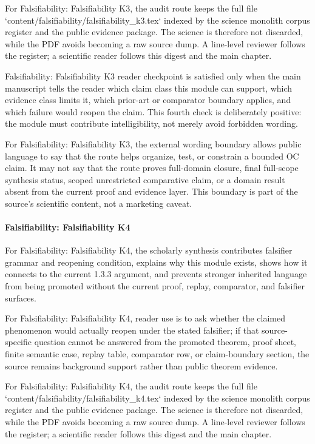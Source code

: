For Falsifiability: Falsifiability K3, the audit route keeps the full file `content/falsifiability/falsifiability\_k3.tex` indexed by the science monolith corpus register and the public evidence package. The science is therefore not discarded, while the PDF avoids becoming a raw source dump. A line-level reviewer follows the register; a scientific reader follows this digest and the main chapter.


Falsifiability: Falsifiability K3 reader checkpoint is satisfied only when the main manuscript tells the reader which claim class this module can support, which evidence class limits it, which prior-art or comparator boundary applies, and which failure would reopen the claim. This fourth check is deliberately positive: the module must contribute intelligibility, not merely avoid forbidden wording.


For Falsifiability: Falsifiability K3, the external wording boundary allows public language to say that the route helps organize, test, or constrain a bounded OC claim. It may not say that the route proves full-domain closure, final full-scope synthesis status, scoped unrestricted comparative claim, or a domain result absent from the current proof and evidence layer. This boundary is part of the source's scientific content, not a marketing caveat.


\paragraph{Falsifiability: Falsifiability K4}

For Falsifiability: Falsifiability K4, the scholarly synthesis contributes falsifier grammar and reopening condition, explains why this module exists, shows how it connects to the current 1.3.3 argument, and prevents stronger inherited language from being promoted without the current proof, replay, comparator, and falsifier surfaces.


For Falsifiability: Falsifiability K4, reader use is to ask whether the claimed phenomenon would actually reopen under the stated falsifier; if that source-specific question cannot be answered from the promoted theorem, proof sheet, finite semantic case, replay table, comparator row, or claim-boundary section, the source remains background support rather than public theorem evidence.


For Falsifiability: Falsifiability K4, the audit route keeps the full file `content/falsifiability/falsifiability\_k4.tex` indexed by the science monolith corpus register and the public evidence package. The science is therefore not discarded, while the PDF avoids becoming a raw source dump. A line-level reviewer follows the register; a scientific reader follows this digest and the main chapter.


